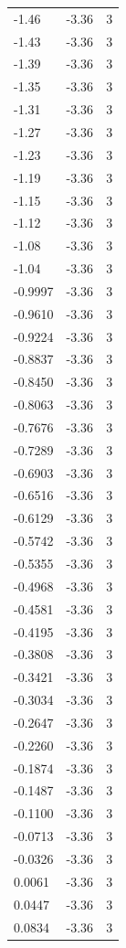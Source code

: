 \begin{longtable}{lrr}
  -1.46 & -3.36 & 3 \\
  -1.43 & -3.36 & 3 \\
  -1.39 & -3.36 & 3 \\
  -1.35 & -3.36 & 3 \\
  -1.31 & -3.36 & 3 \\
  -1.27 & -3.36 & 3 \\
  -1.23 & -3.36 & 3 \\
  -1.19 & -3.36 & 3 \\
  -1.15 & -3.36 & 3 \\
  -1.12 & -3.36 & 3 \\
  -1.08 & -3.36 & 3 \\
  -1.04 & -3.36 & 3 \\
  -0.9997 & -3.36 & 3 \\
  -0.9610 & -3.36 & 3 \\
  -0.9224 & -3.36 & 3 \\
  -0.8837 & -3.36 & 3 \\
  -0.8450 & -3.36 & 3 \\
  -0.8063 & -3.36 & 3 \\
  -0.7676 & -3.36 & 3 \\
  -0.7289 & -3.36 & 3 \\
  -0.6903 & -3.36 & 3 \\
  -0.6516 & -3.36 & 3 \\
  -0.6129 & -3.36 & 3 \\
  -0.5742 & -3.36 & 3 \\
  -0.5355 & -3.36 & 3 \\
  -0.4968 & -3.36 & 3 \\
  -0.4581 & -3.36 & 3 \\
  -0.4195 & -3.36 & 3 \\
  -0.3808 & -3.36 & 3 \\
  -0.3421 & -3.36 & 3 \\
  -0.3034 & -3.36 & 3 \\
  -0.2647 & -3.36 & 3 \\
  -0.2260 & -3.36 & 3 \\
  -0.1874 & -3.36 & 3 \\
  -0.1487 & -3.36 & 3 \\
  -0.1100 & -3.36 & 3 \\
  -0.0713 & -3.36 & 3 \\
  -0.0326 & -3.36 & 3 \\
  0.0061 & -3.36 & 3 \\
  0.0447 & -3.36 & 3 \\
  0.0834 & -3.36 & 3 \\

\end{longtable}
